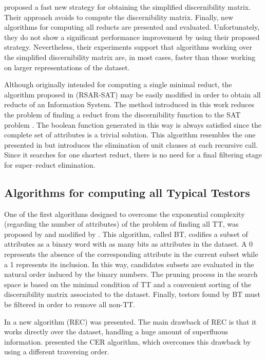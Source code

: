 \documentclass[authoryear,preprint,review,12pt]{elsarticle}
\begin{document}
  \cite{Chen2012} proposed a fast new strategy for obtaining the simplified discernibility matrix. Their approach avoids to compute the discernibility matrix. Finally, new algorithms for computing all reducts are presented and evaluated. Unfortunately, they do not show a significant performance improvement by using their proposed strategy. Nevertheless, their experiments support that algorithms working over the simplified discernibility matrix are, in most cases, faster than those working on larger representations of the dataset.
  
  Although originally intended for computing a single minimal reduct, the algorithm proposed in \citep{Jensen14} (RSAR-SAT) may be easily modified in order to obtain all reducts of an Information System. The method introduced in this work reduces the problem of finding a reduct from the discernibility function to the SAT problem \citep{Davis62}. The boolean function generated in this way is always satisfied since the complete set of attributes is a trivial solution. This algorithm resembles the one presented in \citep{Starzyk99} but introduces the elimination of unit clauses at each recursive call. Since it searches for one shortest reduct, there is no need for a final filtering stage for super--reduct elimination.

\subsection{Algorithms for computing all Typical Testors}
  One of the first algorithms designed to overcome the exponential complexity (regarding the number of attributes)
  of the problem of finding all TT, was proposed by \cite{Ruiz85} and modified by \cite{sanchez02}. This algorithm, called BT, codifies a subset of attributes as a binary word with as many bits as attributes in the dataset. A 0 represents the absence of the corresponding attribute in the current subset while a 1 represents its inclusion. In this way, candidates subsets are evaluated in the natural order induced by the binary numbers. The pruning process in the search space is based on the minimal condition of TT and a convenient sorting of the discernibility matrix associated to the dataset. Finally, testors found by BT must be filtered in order to remove all non-TT.
  
  In \citep{Shulcloper95b} a new algorithm (REC) was presented.
  The main drawback of REC is that it works directly over the dataset, handling a huge amount of superfluous
  information. \cite{Ayaquica97} presented the CER algorithm, which overcomes this drawback by using a different
  traversing order.  
  
\end{document}
